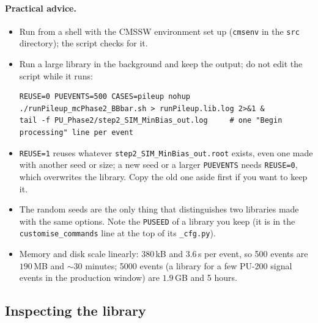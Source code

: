 \documentclass[11pt,a4paper]{article}
\newcommand{\code}[1]{\texttt{#1}}
\begin{document}
\paragraph{Practical advice.}
\begin{itemize}
\item Run from a shell with the CMSSW environment set up (\code{cmsenv} in the \code{src} directory); the
  script checks for it.
\item Run a large library in the background and keep the output; do not edit the script while it runs:
\begin{lstlisting}[style=sh]
REUSE=0 PUEVENTS=500 CASES=pileup nohup ./runPileup_mcPhase2_BBbar.sh > runPileup.lib.log 2>&1 &
tail -f PU_Phase2/step2_SIM_MinBias_out.log     # one "Begin processing" line per event
\end{lstlisting}
\item \code{REUSE=1} reuses whatever \code{step2\_SIM\_MinBias\_out.root} exists, even one made with another
  seed or size; a new seed or a larger \code{PUEVENTS} needs \code{REUSE=0}, which overwrites the library.
  Copy the old one aside first if you want to keep it.
\item The random seeds are the only thing that distinguishes two libraries made with the same options. Note
  the \code{PUSEED} of a library you keep (it is in the \code{customise\_commands} line at the top of its
  \code{\_cfg.py}).
\item Memory and disk scale linearly: 380\,kB and 3.6\,s per event, so 500 events are $190$\,MB and
  $\sim30$ minutes; 5000 events (a library for a few PU-200 signal events in the production window) are
  $1.9$\,GB and 5 hours.
\end{itemize}

\subsection{Inspecting the library}
\label{sec:inspect}
\end{document}
